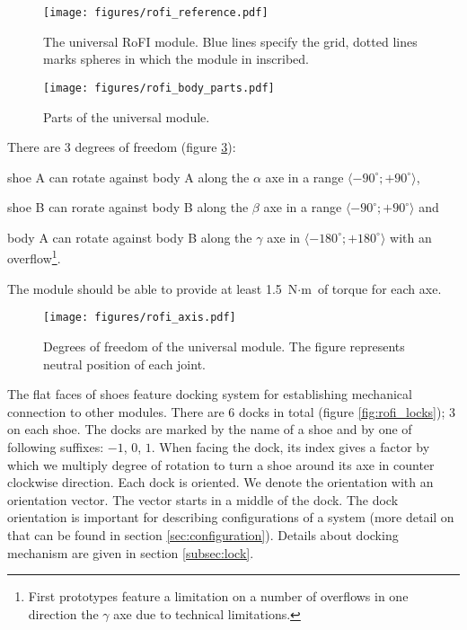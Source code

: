 \begin{figure}
    \centering
    \texttt{[image: figures/rofi\_reference.pdf]}
    \caption{The universal RoFI module. Blue lines specify the grid, dotted
    lines marks spheres in which the module in inscribed. }
    \label{fig:rofi_reference}
\end{figure}

\begin{figure}
    \centering
    \texttt{[image: figures/rofi\_body\_parts.pdf]}
    \caption{Parts of the universal module.}
    \label{fig:rofi_body_parts}
\end{figure}

There are 3 degrees of freedom (figure \ref{fig:rofi_axis}):
\begin{enumerate*}
    \item shoe A can rotate against body A along the $\alpha$ axe in a range
    $\langle -90^\circ; +90^\circ\rangle$,
    \item shoe B can rorate against body B along the $\beta$ axe in a range
    $\langle -90^\circ; +90^\circ\rangle$ and
    \item body A can rotate against body B along the $\gamma$ axe in $\langle
    -180^\circ; +180^\circ\rangle$ with an overflow\footnote{First prototypes
    feature a limitation on a number of overflows in one direction the $\gamma$
    axe due to technical limitations. }.
\end{enumerate*}
The module should be able to provide at least 1.5 $\text{N}\cdot\text{m}$ of
torque for each axe.

\begin{figure}
    \centering
    \texttt{[image: figures/rofi\_axis.pdf]}
    \caption{Degrees of freedom of the universal module. The figure represents neutral position of each joint.}
    \label{fig:rofi_axis}
\end{figure}

The flat faces of shoes feature docking system for establishing mechanical
connection to other modules. There are 6 docks in total (figure
\ref{fig:rofi_locks}); 3 on each shoe. The docks are marked by the name of a
shoe and by one of following suffixes: $-1$, $0$, $1$. When facing the dock, its
index gives a factor by which we multiply degree of rotation to turn a shoe
around its axe in counter clockwise direction. Each dock is oriented. We denote
the orientation with an orientation vector. The vector starts in a middle of the
dock. The dock orientation is important for describing configurations of a
system (more detail on that can be found in section \ref{sec:configuration}).
Details about docking mechanism are given in section \ref{subsec:lock}.

